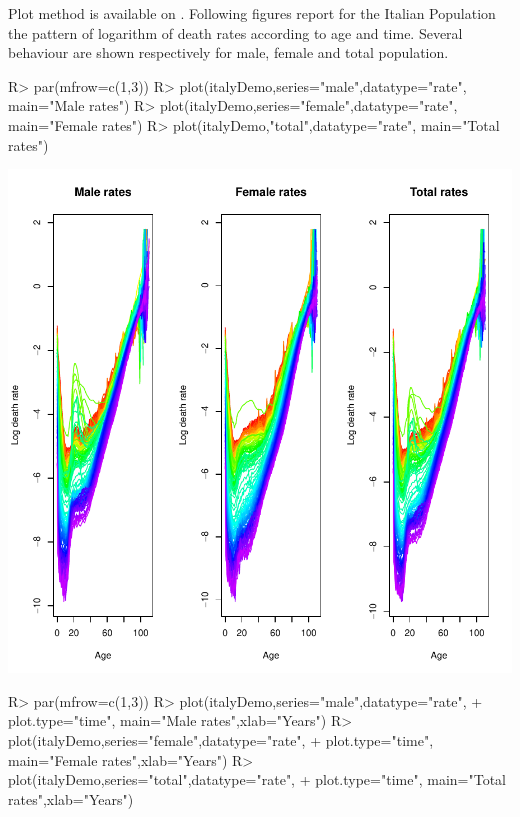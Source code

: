 \documentclass[nojss]{jss}
\begin{document}
Plot method is available on . Following figures report for the Italian Population the pattern of logarithm of death rates according to age and time. Several behaviour are shown respectively for male, female and total population. 

\begin{Schunk}
\begin{Sinput}
R> par(mfrow=c(1,3))
R> plot(italyDemo,series="male",datatype="rate", main="Male rates")
R> plot(italyDemo,series="female",datatype="rate", main="Female rates")
R> plot(italyDemo,"total",datatype="rate", main="Total rates")
\end{Sinput}
\end{Schunk}
\includegraphics{mortality_projection-italyDemoFig}
\begin{Schunk}
\begin{Sinput}
R> par(mfrow=c(1,3))
R> plot(italyDemo,series="male",datatype="rate",
+      plot.type="time", main="Male rates",xlab="Years")
R> plot(italyDemo,series="female",datatype="rate",
+      plot.type="time", main="Female rates",xlab="Years")
R> plot(italyDemo,series="total",datatype="rate",
+      plot.type="time", main="Total rates",xlab="Years")
\end{Sinput}
\end{Schunk}
\end{document}
